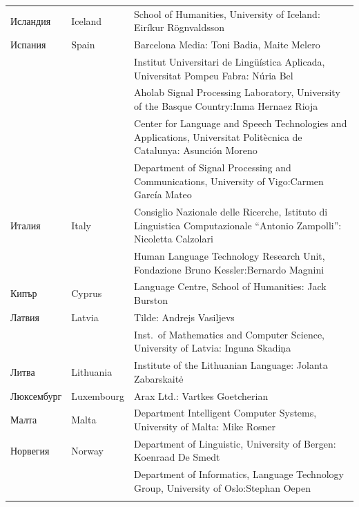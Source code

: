 \begin{longtable}{@{}llp{110mm}@{}}
    Исландия & \textcolor{grey1}{Iceland} & School of Humanities, University of Iceland: Eiríkur Rögnvaldsson\\ \addlinespace
    Испания & \textcolor{grey1}{Spain} & Barcelona Media: Toni Badia, Maite Melero \\ \addlinespace 
    & & Institut Universitari de Lingüística Aplicada, Universitat Pompeu Fabra: Núria Bel \\ \addlinespace 
    & & Aholab Signal Processing Laboratory, University of the Basque Country:\newline Inma Hernaez Rioja \\ \addlinespace 
    & & Center for Language and Speech Technologies and Applications, Universitat Politècnica de Catalunya:  Asunción Moreno \\ \addlinespace 
    & & Department of Signal Processing and Communications, University of Vigo:\newline Carmen García Mateo \\ \addlinespace 
    Италия & \textcolor{grey1}{Italy} & Consiglio Nazionale delle Ricerche, Istituto di Linguistica Computazionale “Antonio Zampolli”: Nicoletta Calzolari\\ \addlinespace
    & & Human Language Technology Research Unit, Fondazione Bruno Kessler:\newline Bernardo Magnini\\ \addlinespace 
    Кипър & \textcolor{grey1}{Cyprus} & Language Centre, School of
    Humanities: Jack Burston\\ \addlinespace
    Латвия & \textcolor{grey1}{Latvia} & Tilde: Andrejs Vasiļjevs\\ \addlinespace 
    & & Inst.~of Mathematics and Computer Science, University of
    Latvia: Inguna Skadiņa\\ \addlinespace
    Литва & \textcolor{grey1}{Lithuania} & Institute of the Lithuanian Language: Jolanta Zabarskaitė\\ \addlinespace
    Люксембург & \textcolor{grey1}{Luxembourg} & Arax Ltd.: Vartkes Goetcherian\\ \addlinespace
    Малта & \textcolor{grey1}{Malta} & Department Intelligent Computer Systems, University of Malta: Mike Rosner\\ \addlinespace
    Норвегия & \textcolor{grey1}{Norway} & Department of Linguistic, University of Bergen: Koenraad De Smedt\\ \addlinespace 
    & & Department of Informatics, Language Technology Group, University of Oslo:\newline Stephan Oepen \\ \addlinespace

\end{longtable}
